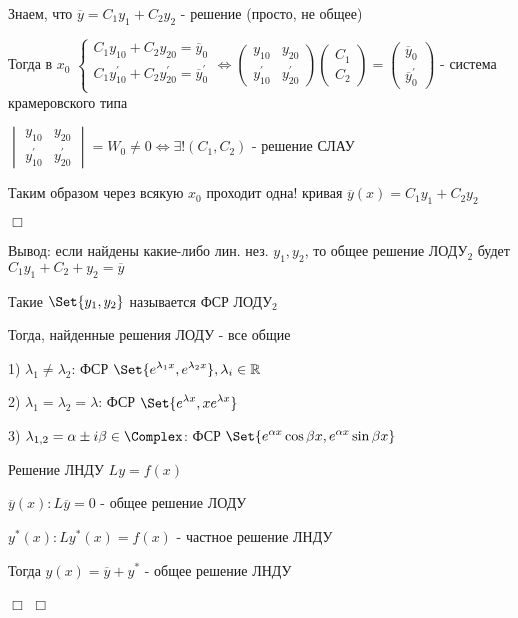 \documentclass[12pt]{article}
\begin{document}
    Знаем, что $\displaystyle \overline{y} = C_1 y_1 + C_2 y_2$ - решение (просто, не общее)

    Тогда в $\displaystyle x_0$ $\displaystyle \begin{cases}
                       C_1 y_{10} + C_2 y_{20} = \overline{y}_0 \\
                       C_1 y_{10}^\prime + C_2 y_{20}^\prime = \overline{y}_0^\prime \\
    \end{cases} \Longleftrightarrow \begin{pmatrix}y_{10} & y_{20} \\ y_{10}^\prime & y_{20}^\prime \end{pmatrix} \begin{pmatrix}C_1 \\ C_2\end{pmatrix} = \begin{pmatrix}\overline{y}_0 \\ \overline{y}^\prime_0\end{pmatrix}$ -
    система крамеровского типа

    $\displaystyle \begin{vmatrix}y_{10} & y_{20} \\ y^\prime_{10} & y^\prime_{20}\end{vmatrix} = W_0 \neq 0 \Longleftrightarrow \exists! (C_1, C_2)$ - решение СЛАУ

    Таким образом через всякую $\displaystyle x_0$ проходит одна! кривая $\displaystyle \overline{y}(x) = C_1 y_1 + C_2 y_2$

    $\Box$

    \Nota Вывод: если найдены какие-либо лин. нез. $\displaystyle y_1, y_2$, то общее решение ЛОДУ$\displaystyle _2$ будет $\displaystyle C_1 y_1 + C_2 + y_2 = \overline{y}$

    \Def Такие $\displaystyle \Set{y_1, y_2}$ называется ФСР ЛОДУ$\displaystyle _2$

    \Nota Тогда, найденные решения ЛОДУ - все общие

    1) $\displaystyle \lambda_1 \neq \lambda_2$: ФСР $\displaystyle \Set{e^{\lambda_1 x}, e^{\lambda_2 x}}, \lambda_i \in \Real$

    2) $\displaystyle \lambda_1 = \lambda_2 = \lambda$: ФСР $\displaystyle \Set{e^{\lambda x}, x e^{\lambda x}}$

    3) $\displaystyle \lambda_{1,2} = \alpha \pm i \beta \in \mathbb{\Complex}$: ФСР $\displaystyle \Set{e^{\alpha x} \cos\beta x, e^{\alpha x} \sin \beta x}$

     Решение ЛНДУ $Ly = f(x)$

    $\overline{y}(x): L\overline{y} = 0$ - общее решение ЛОДУ

    $\displaystyle y^*(x): Ly^*(x) = f(x)$ - частное решение ЛНДУ

    Тогда $\displaystyle y(x) = \overline{y} + y^*$ - общее решение ЛНДУ

    $\Box$ \Lab $\Box$
\end{document}

